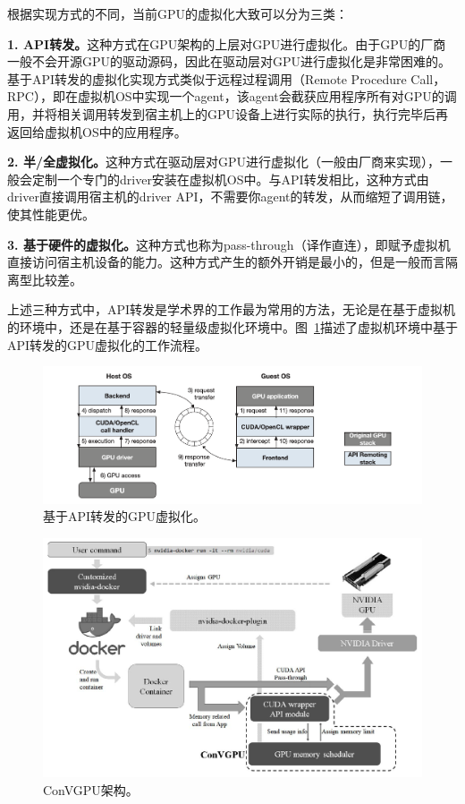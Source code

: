 根据实现方式的不同，当前GPU的虚拟化大致可以分为三类：

\textbf{1. API转发。}这种方式在GPU架构的上层对GPU进行虚拟化。由于GPU的厂商一般不会开源GPU的驱动源码，因此在驱动层对GPU进行虚拟化是非常困难的。基于API转发的虚拟化实现方式类似于远程过程调用（Remote Procedure Call，RPC），即在虚拟机OS中实现一个agent，该agent会截获应用程序所有对GPU的调用，并将相关调用转发到宿主机上的GPU设备上进行实际的执行，执行完毕后再返回给虚拟机OS中的应用程序。

\textbf{2. 半/全虚拟化。}这种方式在驱动层对GPU进行虚拟化（一般由厂商来实现），一般会定制一个专门的driver安装在虚拟机OS中。与API转发相比，这种方式由driver直接调用宿主机的driver API，不需要你agent的转发，从而缩短了调用链，使其性能更优。

\textbf{3. 基于硬件的虚拟化。}这种方式也称为pass-through（译作直连），即赋予虚拟机直接访问宿主机设备的能力。这种方式产生的额外开销是最小的，但是一般而言隔离型比较差。

上述三种方式中，API转发是学术界的工作最为常用的方法，无论是在基于虚拟机的环境中，还是在基于容器的轻量级虚拟化环境中。图~\ref{api_remoting}描述了虚拟机环境中基于API转发的GPU虚拟化的工作流程。

\begin{figure}[h]
    \centerline{\includegraphics[width=\textwidth]{figures/api-remoting.png}}
    \caption{基于API转发的GPU虚拟化。}
    \label{api_remoting}
\end{figure}

\begin{figure}[h]
    \centerline{\includegraphics[width=\textwidth]{figures/convgpu.png}}
    \caption{ConVGPU架构。}
    \label{convgpu_arch}
\end{figure}

